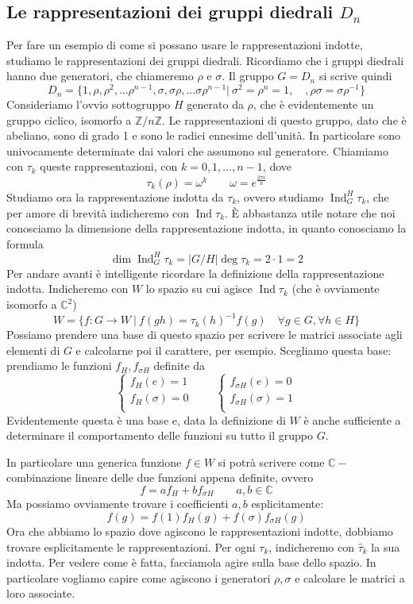 \documentclass[11pt]{article}
\theoremstyle{plain}
\theoremstyle{definition}
\theoremstyle{remark}
\newcommand{\C}{\mathbb{C}}
\newcommand{\Z}{\mathbb{Z}}
\DeclareMathOperator{\Ind}{Ind}
\begin{document}
\subsection{Le rappresentazioni dei gruppi diedrali $D_{n}$}
Per fare un esempio di come si possano usare le rappresentazioni indotte, studiamo le rappresentazioni dei gruppi diedrali.
Ricordiamo che i gruppi diedrali hanno due generatori, che chiameremo $\rho$ e $\sigma$. Il gruppo $G = D_{n}$ si scrive quindi
\[ D_{n} = \{ 1, \rho, \rho^2, ... \rho^{n-1}, \sigma, \sigma\rho, ... \sigma\rho^{n-1} | \ \sigma^2 = \rho^n = 1, \quad, \rho\sigma = \sigma\rho^{-1} \}\]
Consideriamo l'ovvio sottogruppo $H$ generato da $\rho$, che è evidentemente un gruppo ciclico, isomorfo a $\Z / n \Z$.
Le rappresentazioni di questo gruppo, dato che è abeliano, sono di grado 1 e sono le radici ennesime dell'unità.
In particolare sono univocamente determinate dai valori che assumono sul generatore. Chiamiamo con $\tau_k$ queste rappresentazioni, con $k =0, 1,\dots, n-1$, dove
\[\tau_k(\rho) = \omega^k  \qquad \omega = e^{\frac{2\pi i}{n}}\]
Studiamo ora la rappresentazione indotta da $\tau_k$, ovvero studiamo $\Ind_G^H \tau_k$, che per amore di brevità indicheremo con $\Ind \tau_k$. \`E abbastanza utile notare che noi conosciamo la dimensione della rappresentazione indotta, in quanto conosciamo la formula
\[ \dim \Ind^H_G \tau_k = |G/H| \deg \tau_k = 2 \cdot 1 = 2\]
Per andare avanti è intelligente ricordare la definizione della rappresentazione indotta. Indicheremo con $W$ lo spazio su cui agisce $\Ind \tau_k$ (che è ovviamente isomorfo a $\C^2$)
\[ W = \{ f : G \to W\ |\ f(gh) = \tau_k(h)^{-1} f(g) \quad \forall g \in G, \forall h \in H \}\]
Possiamo prendere una base di questo spazio per scrivere le matrici associate agli elementi di $G$ e calcolarne poi il carattere, per esempio. Scegliamo questa base: prendiamo le funzioni $f_H, f_{\sigma H}$ definite da
\[
\begin{cases}
f_H (e) = 1 \\
f_H (\sigma) = 0 \\
\end{cases}
\qquad
\begin{cases}
f_{\sigma H} (e) = 0 \\
f_{\sigma H } (\sigma) = 1 \\
\end{cases}
\]
Evidentemente questa è una base e, data la definizione di $W$ è anche sufficiente a determinare il comportamento delle funzioni su tutto il gruppo $G$.

In particolare una generica funzione $f \in W$ si potrà scrivere come $\C-$combinazione lineare delle due funzioni appena definite, ovvero
\[ f = a f_H + b f_{\sigma H} \qquad a,b \in \C\]
Ma possiamo ovviamente trovare i coefficienti $a,b$ esplicitamente:
\[ f(g) = f(1) f_H(g) + f(\sigma) f_{\sigma H} (g) \]
Ora che abbiamo lo spazio dove agiscono le rappresentazioni indotte, dobbiamo trovare esplicitamente le rappresentazioni. Per ogni $\tau_k$, indicheremo con $\hat \tau_k$ la sua indotta. Per vedere come è fatta, facciamola agire sulla base dello spazio.
In particolare vogliamo capire come agiscono i generatori $\rho, \sigma$ e calcolare le matrici a loro associate.
\end{document}
